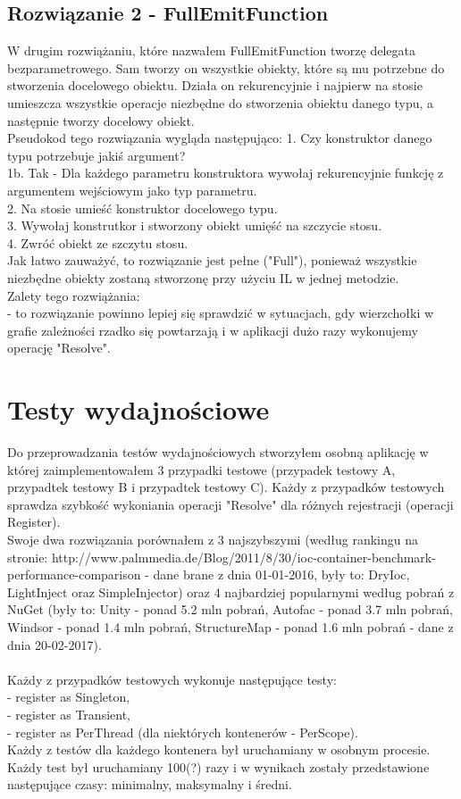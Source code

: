 \documentclass[12pt]{article}
\begin{document}
\subsection{Rozwiązanie 2 - FullEmitFunction}
W drugim rozwiążaniu, które nazwałem FullEmitFunction tworzę delegata bezparametrowego. Sam tworzy on wszystkie obiekty, które są mu potrzebne do stworzenia docelowego obiektu. Działa on rekurencyjnie i najpierw na stosie umieszcza wszystkie operacje niezbędne do stworzenia obiektu danego typu, a następnie tworzy docelowy obiekt.\\
Pseudokod tego rozwiązania wygląda następująco:
1. Czy konstruktor danego typu potrzebuje jakiś argument?\\
1b. Tak - Dla każdego parametru konstruktora wywołaj rekurencyjnie funkcję z argumentem wejściowym jako typ parametru.\\
2. Na stosie umieść konstruktor docelowego typu.\\
3. Wywołaj konstrutkor i stworzony obiekt umięść na szczycie stosu.\\
4. Zwróć obiekt ze szczytu stosu.\\
Jak łatwo zauważyć, to rozwiązanie jest pełne ("Full"), ponieważ wszystkie niezbędne obiekty zostaną stworzonę przy użyciu IL w jednej metodzie.\\
Zalety tego rozwiążania:\\
- to rozwiązanie powinno lepiej się sprawdzić w sytuacjach, gdy wierzchołki w grafie zależności rzadko się powtarzają i w aplikacji dużo razy wykonujemy operację "Resolve".

\section{Testy wydajnościowe}
Do przeprowadzania testów wydajnościowych stworzyłem osobną aplikację w której zaimplementowałem 3 przypadki testowe (przypadek testowy A, przypadtek testowy B i przypadtek testowy C). Każdy z przypadków testowych sprawdza szybkość wykoniania operacji "Resolve" dla różnych rejestracji (operacji Register).\\
Swoje dwa rozwiązania porównałem z 3 najszybszymi (według rankingu na stronie: http://www.palmmedia.de/Blog/2011/8/30/ioc-container-benchmark-performance-comparison - dane brane z dnia 01-01-2016, były to: DryIoc, LightInject oraz SimpleInjector) oraz 4 najbardziej popularnymi według pobrań z NuGet (były to: Unity - ponad 5.2 mln pobrań, Autofac - ponad 3.7 mln pobrań, Windsor - ponad 1.4 mln pobrań, StructureMap - ponad 1.6 mln pobrań - dane z dnia 20-02-2017).\\
\\
Każdy z przypadków testowych wykonuje następujące testy:\\
- register as Singleton,\\
- register as Transient,\\
- register as PerThread (dla niektórych kontenerów - PerScope).\\
Każdy z testów dla każdego kontenera był uruchamiany w osobnym procesie. Każdy test był uruchamiany 100(?) razy i w wynikach zostały przedstawione następujące czasy: minimalny,  maksymalny i średni.
\end{document}
